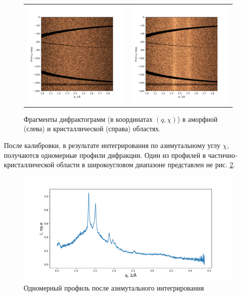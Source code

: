 		\begin{figure}[t]\center
\begin{tabular}{cc}
\includegraphics[width=0.5\linewidth]{fig/azim-amo.pdf}
&
\includegraphics[width=0.5\linewidth]{fig/azim-cryst.pdf}
\end{tabular}
\caption{Фрагменты дифрактограмм (в координатах $(q,\chi)$) в аморфной (слева) и кристаллической (справа) областях.}
\label{fig:azim}
\end{figure}
	
После калибровки, в результате интегрирования по азимутальному углу $\chi$, получаются одномерные профили дифракции. Один из профилей в частично-кристаллической области в широкоугловом диапазоне представлен не рис. \ref{fig:waxs_profile}.

\begin{figure}[h]
    \centering
    \includegraphics[width=\linewidth]{fig/profile.pdf}
    \caption{Одномерный профиль после азимутального интегрирования}
    \label{fig:waxs_profile}
\end{figure}


